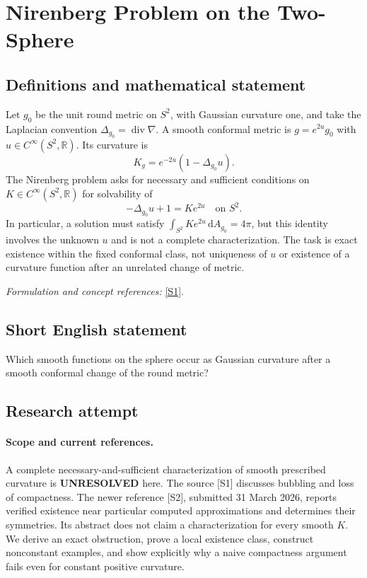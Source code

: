 \documentclass[11pt]{article}
\begin{document}
\section*{\texorpdfstring{Nirenberg Problem on the Two-Sphere}{Nirenberg Problem on the Two-Sphere}}\label{30006862}
\subsection{Definitions and mathematical statement}
Let $g_0$ be the unit round metric on $S^2$, with Gaussian curvature one, and take the Laplacian convention $\Delta_{g_0}=\operatorname{div}\nabla$. A smooth conformal metric is $g=e^{2u}g_0$ with $u\in C^\infty(S^2,{\mathbb{R}})$. Its curvature is
\[
 K_g=e^{-2u}(1-\Delta_{g_0}u).
\]
The Nirenberg problem asks for necessary and sufficient conditions on $K\in C^\infty(S^2,{\mathbb{R}})$ for solvability of
\[
 -\Delta_{g_0}u+1=K e^{2u}\quad\text{on }S^2.
\]
In particular, a solution must satisfy $\int_{S^2}K e^{2u}{\,\mathrm{d}} A_{g_0}=4\pi$, but this identity involves the unknown $u$ and is not a complete characterization. The task is exact existence within the fixed conformal class, not uniqueness of $u$ or existence of a curvature function after an unrelated change of metric.
\par\smallskip\textit{Formulation and concept references:} \href{https://link.springer.com/article/10.1007/s00032-022-00370-1}{[S1]}.

\subsection{Short English statement}
Which smooth functions on the sphere occur as Gaussian curvature after a smooth conformal change of the round metric?
\subsection{Research attempt}
\paragraph{Scope and current references.}
A complete necessary-and-sufficient characterization of smooth
prescribed curvature is \textbf{UNRESOLVED} here. The source [S1]
discusses bubbling and loss of compactness. The newer reference [S2],
submitted 31 March 2026, reports verified existence near particular
computed approximations and determines their symmetries. Its abstract
does not claim a characterization for every smooth $K$. We derive
an exact obstruction, prove a local existence class, construct
nonconstant examples, and show explicitly why a naive compactness
argument fails even for constant positive curvature.
\end{document}

